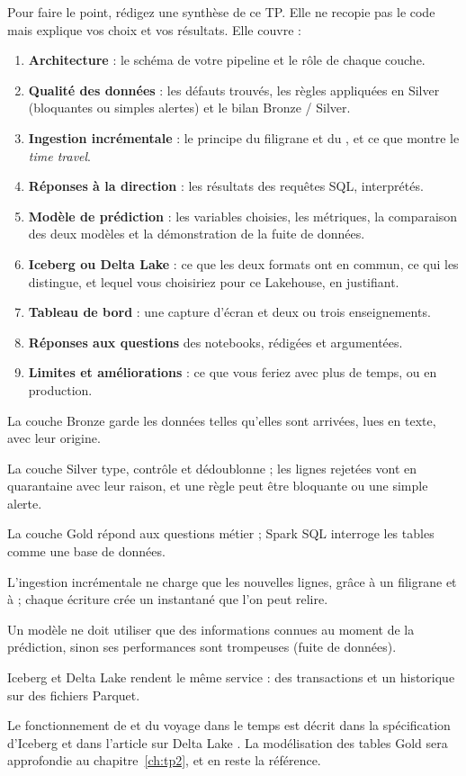 Pour faire le point, rédigez une synthèse de ce TP. Elle ne recopie pas le code mais explique
vos choix et vos résultats. Elle couvre :
\begin{enumerate}[leftmargin=*,itemsep=2pt]
  \item \textbf{Architecture} : le schéma de votre pipeline et le rôle de chaque couche.
  \item \textbf{Qualité des données} : les défauts trouvés, les règles appliquées en Silver
        (bloquantes ou simples alertes) et le bilan Bronze / Silver.
  \item \textbf{Ingestion incrémentale} : le principe du filigrane et du , et ce que montre
        le \emph{time travel}.
  \item \textbf{Réponses à la direction} : les résultats des requêtes SQL, interprétés.
  \item \textbf{Modèle de prédiction} : les variables choisies, les métriques, la comparaison des deux
        modèles et la démonstration de la fuite de données.
  \item \textbf{Iceberg ou Delta Lake} : ce que les deux formats ont en commun, ce qui les distingue,
        et lequel vous choisiriez pour ce Lakehouse, en justifiant.
  \item \textbf{Tableau de bord} : une capture d'écran et deux ou trois enseignements.
  \item \textbf{Réponses aux questions} des notebooks, rédigées et argumentées.
  \item \textbf{Limites et améliorations} : ce que vous feriez avec plus de temps, ou en production.
\end{enumerate}

\begin{aretenir}
  \item La couche Bronze garde les données telles qu'elles sont arrivées, lues en texte, avec leur origine.
  \item La couche Silver type, contrôle et dédoublonne ; les lignes rejetées vont en quarantaine avec leur raison, et une règle peut être bloquante ou une simple alerte.
  \item La couche Gold répond aux questions métier ; Spark SQL interroge les tables comme une base de données.
  \item L'ingestion incrémentale ne charge que les nouvelles lignes, grâce à un filigrane et à  ; chaque écriture crée un instantané que l'on peut relire.
  \item Un modèle ne doit utiliser que des informations connues au moment de la prédiction, sinon ses performances sont trompeuses (fuite de données).
  \item Iceberg et Delta Lake rendent le même service : des transactions et un historique sur des fichiers Parquet.
\end{aretenir}

\begin{plusloin}
Le fonctionnement de  et du voyage dans le temps est décrit dans la spécification d'Iceberg \citep{icebergspec} et dans l'article sur Delta Lake \citep{armbrust2020}. La modélisation des tables Gold sera approfondie au chapitre~\ref{ch:tp2}, et \citet{kimball2013} en reste la référence.
\end{plusloin}
